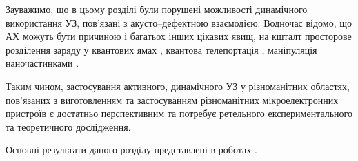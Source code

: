 Зауважимо, що в цьому розділі були порушені можливості динамічного використання УЗ, пов'язані з акусто--дефектною взаємодією.
Водночас відомо, що АХ можуть бути причиною і багатьох інших цікавих явищ, на кшталт просторове розділення заряду у квантових ямах \cite{Kuryliuk2009}, квантова телепортація \cite{Buscemi}, маніпуляція наночастинками \cite{Cuberes,Olikh:SPQEO2010}.

Таким чином, застосування активного, динамічного УЗ у різноманітних областях, пов'язаних з виготовленням та застосуванням різноманітних мікроелектронних пристроїв є достатньо перспективним та потребує ретельного експериментального та теоретичного дослідження.



%
%
%
%
%
%
%
%
%
%
%
%
%
%





Основні результати даного розділу представлені в роботах \cite{Olikh:SEMT2004,Olikh:SEMT2011,1UNCPS,2013Buk}.

